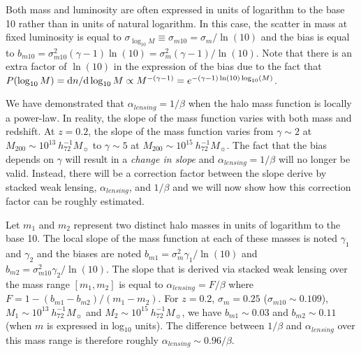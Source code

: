 \documentclass[12pt]{emulateapj}
\newcommand{\mass}{h_{72}^{-1} M_{\sun}}
\begin{document}
Both mass and luminosity are often expressed in units of logarithm to
the base 10 rather than in units of natural logarithm. In this case,
the scatter in mass at fixed luminosity is equal to $\sigma_{\log_{10}
  M} \equiv \sigma_{m10}=\sigma_{m}/\ln(10)$ and the bias is equal to
$b_{m10}=\sigma_{m10}^2(\gamma-1)
\ln(10)=\sigma_{m}^2(\gamma-1)/\ln(10)$. Note that there is an extra
factor of $\ln(10)$ in the expression of the bias due to the fact that
$P(\log_{10} M)={\rm d}n/{\rm d}\log_{10} M \propto M^{-(\gamma-1)}=e^{-(\gamma-1)
  \ln(10) \log_{10}(M)}$.

We have demonstrated that $\alpha_{lensing}=1/\beta$ when the halo mass function
is locally a power-law. In reality, the slope of the mass function
varies with both mass and redshift. At $z=0.2$, the slope of the mass
function varies from $\gamma \sim 2$ at $M_{200} \sim 10^{13}~\mass$
to $\gamma \sim 5$ at $M_{200} \sim 10^{15}~\mass$. The fact that the
bias depends on $\gamma$ will result in a {\em change in slope} and
$\alpha_{lensing}=1/\beta$ will no longer be valid. Instead, there will be a
correction factor between the slope derive by stacked weak lensing,
$\alpha_{lensing}$, and $1/\beta$ and we will now show how this
correction factor can be roughly estimated.

Let $m_{1}$ and $m_{2}$ represent two distinct halo masses in units of
logarithm to the base 10. The local slope of the mass function at each
of these masses is noted $\gamma_1$ and $\gamma_2$ and the biases are
noted $b_{m1}=\sigma_{m}^2\gamma_1/\ln(10)$ and
$b_{m2}=\sigma_{m10}^2\gamma_2/\ln(10)$. The slope that is derived via
stacked weak lensing over the mass range $[m_{1},m_{2}]$ is equal to
$\alpha_{lensing}=F/\beta$ where $F=1-(b_{m1}-b_{m2})/(m_1-m_2)$. For
$z=0.2$, $\sigma_{m}=0.25$ ($\sigma_{m10} \sim 0.109$), $M_{1} \sim
10^{13}~\mass$ and $M_{2} \sim 10^{15}~\mass$, we have $b_{m1} \sim
0.03$ and $b_{m2} \sim 0.11$ (when $m$ is expressed in log$_{10}$
units). The difference between $1/\beta$ and $\alpha_{lensing}$ over
this mass range is therefore roughly $\alpha_{lensing} \sim
0.96/\beta$.




\end{document}

